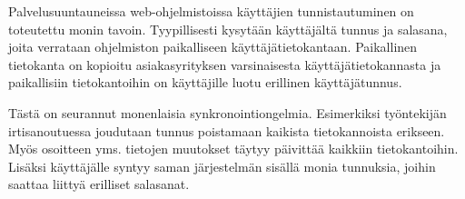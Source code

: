 Palvelusuuntauneissa web-ohjelmistoissa käyttäjien tunnistautuminen on toteutettu monin tavoin. Tyypillisesti kysytään käyttäjältä tunnus ja salasana, joita verrataan ohjelmiston paikalliseen käyttäjätietokantaan. Paikallinen tietokanta on kopioitu asiakasyrityksen varsinaisesta käyttäjätietokannasta ja paikallisiin tietokantoihin on käyttäjille luotu erillinen käyttäjätunnus.

Tästä on seurannut monenlaisia synkronointiongelmia. Esimerkiksi työntekijän irtisanoutuessa joudutaan tunnus poistamaan kaikista tietokannoista erikseen. Myös osoitteen yms. tietojen muutokset täytyy päivittää kaikkiin tietokantoihin. Lisäksi käyttäjälle syntyy saman järjestelmän sisällä monia tunnuksia, joihin saattaa liittyä erilliset salasanat.